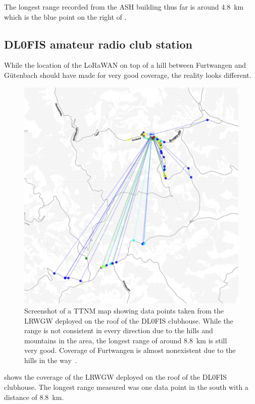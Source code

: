 The longest range recorded from the \ac{ASH} building thus far is around \SI{4.8}{\kilo\meter} which is the blue point on the right of .

\subsection{DL0FIS amateur radio club station}

While the location of the \ac{LoRaWAN} on top of a hill between Furtwangen and Gütenbach should have made for very good coverage, the reality looks different.

\begin{figure}[htbp]
    \centering
    \includegraphics[width=.8\textwidth]{pictures/ttn-mapper/gateway-ranges/dl0fis_gw_range.jpg}
    \caption[Screenshot of a \acl{TTNM} map showing data points taken from the \acl{LRWGW} deployed on the roof of the DL0FIS clubhouse]{
        Screenshot of a \ac{TTNM} map showing data points taken from the \acl{LRWGW} deployed on the roof of the DL0FIS clubhouse.
        While the range is not consistent in every direction due to the hills and mountains in the area, the longest range of around \SI{8.8}{\kilo\meter} is still very good.
        Coverage of Furtwangen is almost nonexistent due to the hills in the way~\cite{ttn_mapper_ttn_2023}.
    }\label{pic:dl0fis_gw_range}
\end{figure}

 shows the coverage of the \acl{LRWGW} deployed on the roof of the DL0FIS clubhouse.
The longest range measured was one data point in the south with a distance of \SI{8.8}{\kilo\meter}.

